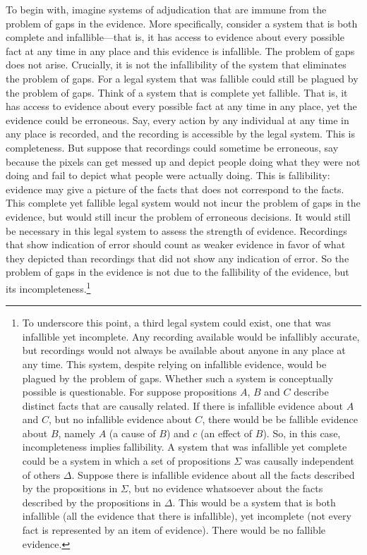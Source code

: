 \documentclass[
  10pt,
  dvipsnames,enabledeprecatedfontcommands]{scrartcl}
\begin{document}
To begin with, imagine systems of adjudication that are immune from the
problem of gaps in the evidence. More specifically, consider a system
that is both complete and infallible---that is, it has access to
evidence about every possible fact at any time in any place and this
evidence is infallible. The problem of gaps does not arise. Crucially,
it is not the infallibility of the system that eliminates the problem of
gaps. For a legal system that was fallible could still be plagued by the
problem of gaps. Think of a system that is complete yet fallible. That
is, it has access to evidence about every possible fact at any time in
any place, yet the evidence could be erroneous. Say, every action by any
individual at any time in any place is recorded, and the recording is
accessible by the legal system. This is completeness. But suppose that
recordings could sometime be erroneous, say because the pixels can get
messed up and depict people doing what they were not doing and fail to
depict what people were actually doing. This is fallibility: evidence
may give a picture of the facts that does not correspond to the facts.
This complete yet fallible legal system would not incur the problem of
gaps in the evidence, but would still incur the problem of erroneous
decisions. It would still be necessary in this legal system to assess
the strength of evidence. Recordings that show indication of error
should count as weaker evidence in favor of what they depicted than
recordings that did not show any indication of error. So the problem of
gaps in the evidence is not due to the fallibility of the evidence, but
its incompleteness.\footnote{To underscore this point, a third legal
  system could exist, one that was infallible yet incomplete. Any
  recording available would be infallibly accurate, but recordings would
  not always be available about anyone in any place at any time. This
  system, despite relying on infallible evidence, would be plagued by
  the problem of gaps. Whether such a system is conceptually possible is
  questionable. For suppose propositions \(A\), \(B\) and \(C\) describe
  distinct facts that are causally related. If there is infallible
  evidence about \(A\) and \(C\), but no infallible evidence about
  \(C\), there would be be fallible evidence about \(B\), namely \(A\)
  (a cause of \(B\)) and \(c\) (an effect of \(B\)). So, in this case,
  incompleteness implies fallibility. A system that was infallible yet
  complete could be a system in which a set of propositions \(\Sigma\)
  was causally independent of others \(\Delta\). Suppose there is
  infallible evidence about all the facts described by the propositions
  in \(\Sigma\), but no evidence whatsoever about the facts described by
  the propositions in \(\Delta\). This would be a system that is both
  infallible (all the evidence that there is infallible), yet incomplete
  (not every fact is represented by an item of evidence). There would be
  no fallible evidence.}
\end{document}
